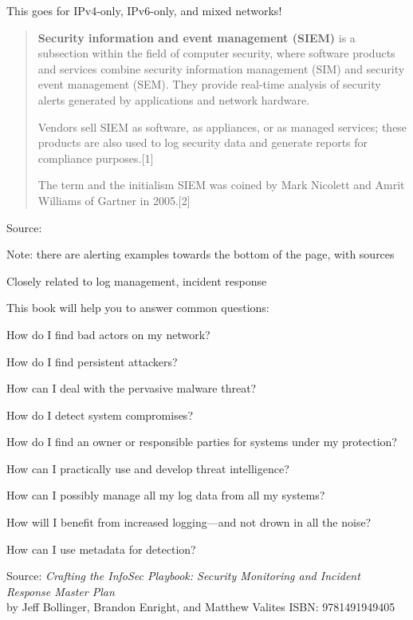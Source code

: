 \documentclass[Screen16to9,17pt]{foils}
\begin{document}
\centerline{This goes for IPv4-only, IPv6-only, and mixed networks!}




\begin{quote}
{\bf Security information and event management (SIEM)} is a subsection within the field of computer security, where software products and services combine security information management (SIM) and security event management (SEM). They provide real-time analysis of security alerts generated by applications and network hardware.

  Vendors sell SIEM as software, as appliances, or as managed services; these products are also used to log security data and generate reports for compliance purposes.[1]

  The term and the initialism SIEM was coined by Mark Nicolett and Amrit Williams of Gartner in 2005.[2]
\end{quote}
Source: 

\begin{list2}
  \item Note: there are alerting examples towards the bottom of the page, with sources
  \item Closely related to log management, incident response
\end{list2}




This book will help you to answer common questions:
\begin{list2}
\item How do I find bad actors on my network?
\item How do I find persistent attackers?
\item How can I deal with the pervasive malware threat?
\item How do I detect system compromises?
\item How do I find an owner or responsible parties for systems under my protection?
\item How can I practically use and develop threat intelligence?
\item How can I possibly manage all my log data from all my systems?
\item How will I benefit from increased logging—and not drown in all the noise?
\item How can I use metadata for detection?
\end{list2}
Source: \emph{Crafting the InfoSec Playbook: Security Monitoring and Incident Response Master Plan}\\
 by Jeff Bollinger, Brandon Enright, and Matthew Valites ISBN: 9781491949405
\end{document}
